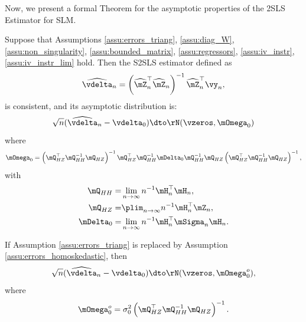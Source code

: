 \documentclass[english,12pt]{book}\usepackage[]{graphicx}\usepackage[]{xcolor}
\begin{document}
Now, we present a formal Theorem for the asymptotic properties of the 2SLS Estimator for SLM.

\begin{theorem}\label{teo:S2SLS_est_slm}
  Suppose that Assumptions \ref{assu:errors_triang}, \ref{assu:diag_W},  \ref{assu:non_singularity}, \ref{assu:bounded_matrix}, \ref{assu:regressors}, \ref{assu:iv_instr}, \ref{assu:iv_instr_lim} hold. Then the S2SLS estimator defined as
  \begin{equation*}
    \widehat{\vdelta}_n = \left(\widehat{\mZ}_n^\top\widehat{\mZ}_n\right)^{-1}\widehat{\mZ}_n^\top\vy_n, 
  \end{equation*}
%
is consistent, and its asymptotic distribution is:
\begin{equation*}
\sqrt{n}(\widehat{\vdelta}_{n} - \vdelta_0) \dto \rN(\vzeros, \mOmega_0)
\end{equation*}
%
where
\begin{equation}\label{eq:var-cov-het-2sls}
\mOmega_0 = \left(\mQ_{HZ}^\top\mQ_{HH}^{-1}\mQ_{HZ}\right)^{-1}\mQ_{HZ}^\top\mQ_{HH}^{-1}\mDelta_0 \mQ_{HH}^{-1}\mQ_{HZ}\left(\mQ_{HZ}^\top\mQ_{HH}^{-1}\mQ_{HZ}\right)^{-1}, 
\end{equation}
%
with 
\begin{equation*}
\begin{aligned}
 \mQ_{HH} = &  \lim_{n\to \infty} n^{-1}\mH_n^\top\mH_n,\\
\mQ_{HZ}  = &  \plim_{n\to \infty} n^{-1}\mH_n^\top\mZ_n, \\
\mDelta_0 = & \lim_{n\to \infty} n^{-1}\mH_n^\top \mSigma_n \mH_n.
\end{aligned}
\end{equation*}

If Assumption \ref{assu:errors_triang} is replaced by Assumption \ref{assu:errors_homoskedastic}, then
\begin{equation*}
\sqrt{n}(\widehat{\vdelta}_{n} - \vdelta_0) \dto \rN(\vzeros, \mOmega_0^o),
\end{equation*}
%
where 
\begin{equation}\label{eq:var-cov-homo-2sls}
\mOmega_0^o = \sigma_{0}^2\left(\mQ_{HZ}^\top\mQ_{HH}^{-1}\mQ_{HZ}\right)^{-1}.
\end{equation}
\end{theorem}
\end{document}
